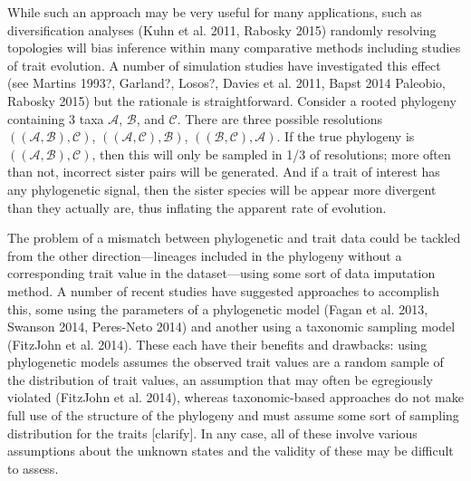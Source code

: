 \documentclass[a4paper,11pt]{article}
\begin{document}
While such an approach may be very useful for many applications, such as diversification analyses (Kuhn et al. 2011, Rabosky 2015) randomly resolving topologies will bias inference within many comparative methods including studies of trait evolution. A number of simulation studies have investigated this effect (see Martins 1993?, Garland?, Losos?, Davies et al. 2011, Bapst 2014 Paleobio, Rabosky 2015) but the rationale is straightforward. Consider a rooted phylogeny containing 3 taxa $\mathcal{A}$, $\mathcal{B}$, and $\mathcal{C}$. There are three possible resolutions $((\mathcal{A},\mathcal{B}),\mathcal{C})$, $((\mathcal{A},\mathcal{C}),\mathcal{B})$, $((\mathcal{B},\mathcal{C}),\mathcal{A})$. If the true phylogeny is $((\mathcal{A},\mathcal{B}),\mathcal{C})$, then this will only be sampled in 1/3 of resolutions; more often than not, incorrect sister pairs will be generated. And if a trait of interest has any phylogenetic signal, then the sister species will be appear more divergent than they actually are, thus inflating the apparent rate of evolution.

The problem of a mismatch between phylogenetic and trait data could be tackled from the other direction---lineages included in the phylogeny without a corresponding trait value in the dataset---using some sort of data imputation method. A number of recent studies have suggested approaches to accomplish this, some using the parameters of a phylogenetic model (Fagan et al. 2013, Swanson 2014, Peres-Neto 2014) and another using a taxonomic sampling model (FitzJohn et al. 2014). These each have their benefits and drawbacks: using phylogenetic models assumes the observed trait values are a random sample of the distribution of trait values, an assumption that may often be egregiously violated (FitzJohn et al. 2014), whereas taxonomic-based approaches do not make full use of the structure of the phylogeny and must assume some sort of sampling distribution for the traits [clarify]. In any case, all of these involve various assumptions about the unknown states and the validity of these may be difficult to assess.


\end{document}
